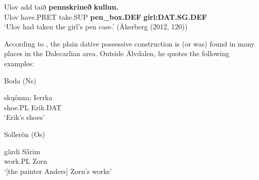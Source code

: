 

 \ea\label{}
\gll Ulov  add  taið  \textbf{pennskrineð} \textbf{kullun.}\\


Ulov  have.PRET  take.SUP  \textbf{pen\_box.DEF} \textbf{girl:DAT.SG.DEF}\\

\glt ‘Ulov had taken the girl’s pen case.’ (Åkerberg (2012, 120))

\z

According to \citet[112]{Levander1928}, the plain dative possessive construction is (or was) found in many places in the Dalecarlian area. Outside Älvdalen, he quotes the following examples:


\item 

Boda (Ns)



 \ea\label{}
\gll sk\k{u}ônna;  Ierrka\\


shoe.PL  Erik.DAT\\

\glt ‘Erik’s shoes’

\z

\item 

Sollerön (Os)



 \ea\label{}
\gll g\={ä}rdi  S\={å}rim\\


work.PL  Zorn\\

\glt ‘[the painter Anders] Zorn’s works’ 

